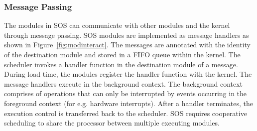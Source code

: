 \subsubsection{Message Passing}
%
The modules in SOS can communicate with other modules and the kernel
through message passing.
%
SOS modules are implemented as message handlers as shown in
Figure~\ref{fig:modinteract}.
%
The messages are annotated with the identity of the destination module
and stored in a FIFO queue within the kernel.
%
The scheduler invokes a handler function in the destination module of
a message.
%
During load time, the modules register the handler function with
the kernel.
%
%
The message handlers execute in the background context.
%
The background context comprises of operations that can only be
interrupted by events occurring in the foreground context (for
e.g. hardware interrupts).
%
%
After a handler terminates, the execution control is transferred back
to the scheduler.
%
SOS requires cooperative scheduling to share the processor between
multiple executing modules.
%
